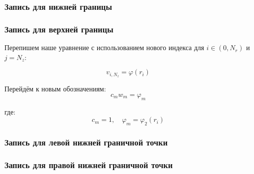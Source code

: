 \subsubsection{Запись для нижней границы}

\subsubsection{Запись для верхней границы}
Перепишем наше уравнение с использованием нового индекса для $i \in (0, N_r) $ и $ j = N_z $:

\[
  v_{i, N_z} = \varphi(r_i)
\]

Перейдём к новым обозначениям:
\[
  c_m w_m = \varphi_m
\]

где:
\[
  c_m = 1, \quad \varphi_m = \varphi_2(r_i)
\]


\subsubsection{Запись для левой нижней граничной точки}

\subsubsection{Запись для правой нижней граничной точки}

